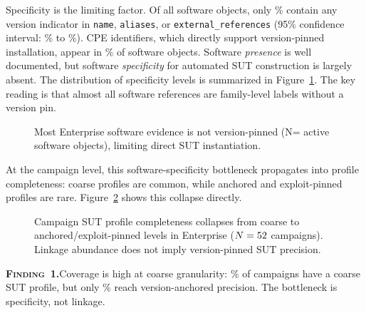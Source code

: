 \documentclass[sigconf,anonymous,review]{acmart}
\newcommand{\finding}[2]{%
  \begin{findingenv}%
    \textsc{\textbf{Finding~#1.}}\enspace #2%
  \end{findingenv}%
}
\begin{document}
Specificity is the limiting factor. Of all \enterpriseactivesoftwarecount{} software objects, only \softwarewithversionsignalpercentage\% contain any version indicator in \texttt{name}, \texttt{aliases}, or \texttt{external\_references} (95\% confidence interval: \softwarewithversionsignalcilow{}\% to \softwarewithversionsignalcihigh{}\%). CPE identifiers, which directly support version-pinned installation, appear in \softwarewithcpepercentage\% of software objects. Software \emph{presence} is well documented, but software \emph{specificity} for automated SUT construction is largely absent. The distribution of specificity levels is summarized in Figure~\ref{fig:software_specificity}. The key reading is that almost all software references are family-level labels without a version pin.

\begin{figure}[!tb]
\centering
\resizebox{\columnwidth}{!}{}
\caption{Most Enterprise software evidence is not version-pinned (N=\enterpriseactivesoftwarecount{} active software objects), limiting direct SUT instantiation.}\label{fig:software_specificity}
\end{figure}

At the campaign level, this software-specificity bottleneck propagates into profile completeness: coarse profiles are common, while anchored and exploit-pinned profiles are rare. Figure~\ref{fig:tier_collapse} shows this collapse directly.

\begin{figure}[!tb]
\centering
\resizebox{\columnwidth}{!}{}
\caption{\label{fig:tier_collapse}Campaign SUT profile completeness collapses from coarse to anchored/exploit-pinned levels in Enterprise ($N=52{}$ campaigns). Linkage abundance does not imply version-pinned SUT precision.}
\end{figure}

\finding{1}{Coverage is high at coarse granularity: \campaignsuttiercoarsepct\% of campaigns have a coarse SUT profile, but only \campaignsuttieranchoredpct\% reach version-anchored precision. The bottleneck is specificity, not linkage.}
\end{document}

